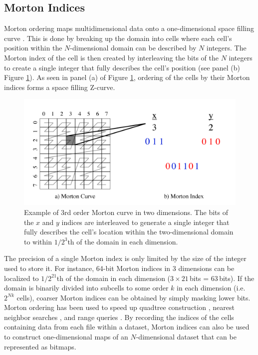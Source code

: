 \documentclass[apjl]{emulateapj}
\begin{document}
\subsection{Morton Indices}
Morton ordering maps multidimensional data onto a one-dimensional space filling curve \citep{Morton1996}. This is done by breaking up the domain into cells where each cell's position within the $N$-dimensional domain can be described by $N$ integers. The Morton index of the cell is then created by interleaving the bits of the $N$ integers to create a single integer that fully describes the cell's position (see panel (b) Figure \ref{fig:zorder}). As seen in panel (a) of Figure \ref{fig:zorder}, ordering of the cells by their Morton indices forms a space filling Z-curve.
%
\ifinclfig
	\begin{figure}[htbp]
	\begin{center}
	\includegraphics[width=\columnwidth,keepaspectratio]{../images/zorder.png}
	\caption{Example of 3rd order Morton curve in two dimensions. The bits of the $x$ and $y$ indices are interleaved to generate a single integer that fully describes the cell's location within the two-dimensional domain to within $1/2^{3}$th of the domain in each dimension.}
	\label{fig:zorder}
	\end{center}
	\end{figure}
\fi
%

The precision of a single Morton index is only limited by the size of the integer used to store it. For instance, 64-bit Morton indices in 3 dimensions can be localized to $1/2^{21}$th of the domain in each dimension ($3\times21$\,bits = 63\,bits). If the domain is binarily divided into subcells to some order $k$ in each dimension (i.e. $2^{Nk}$ cells), coarser Morton indices can be obtained by simply masking lower bits. Morton ordering has been used to speed up quadtree construction \citep{Hjaltason2002}, nearest neighbor searches \citep{Connor2010}, and range queries \citep{Orenstein1984}. By recording the indices of the cells containing data from each file within a dataset, Morton indices can also be used to construct one-dimensional maps of an $N$-dimensional dataset that can be represented as bitmaps.
\end{document}

